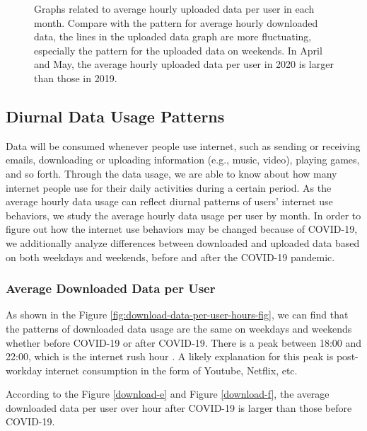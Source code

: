 \begin{figure}[t]
  \caption{Graphs related to average hourly uploaded data per user in each month. Compare with the pattern for average hourly downloaded data, the lines in the uploaded data graph are more fluctuating, especially the pattern for the uploaded data on weekends. In April and May, the average hourly uploaded data per user in 2020 is larger than those in 2019.}
  \label{fig:upload_data_per_user_hours_fig} 
\end{figure}


\subsection{Diurnal Data Usage Patterns}
Data will be consumed whenever people use internet, such as sending or receiving emails, downloading or uploading information (e.g., music, video), playing games, and so forth.
Through the data usage, we are able to know about how many internet people use for their daily activities during a certain period. As the average hourly data usage can reflect diurnal patterns of users’ internet use behaviors, we study the average hourly data usage per user by month. In order to figure out how the internet use behaviors may be changed because of COVID-19, we additionally analyze differences between downloaded and uploaded data based on both weekdays and weekends, before and after the COVID-19 pandemic.

\subsubsection{Average Downloaded Data per User}
\label{sec:download-data-per-user-over-hours}


As shown in the Figure \ref{fig:download-data-per-user-hours-fig}, we can find that the patterns of downloaded data usage are the same on weekdays and weekends whether before COVID-19 or after COVID-19. There is a peak between 18:00 and 22:00, which is the internet rush hour \cite{internetrushhour}. A likely explanation for this peak is post-workday internet consumption in the form of Youtube, Netflix, etc. 

According to the Figure \ref{download-e} and Figure \ref{download-f}, the average downloaded data per user over hour after COVID-19 is larger than those before COVID-19. 

